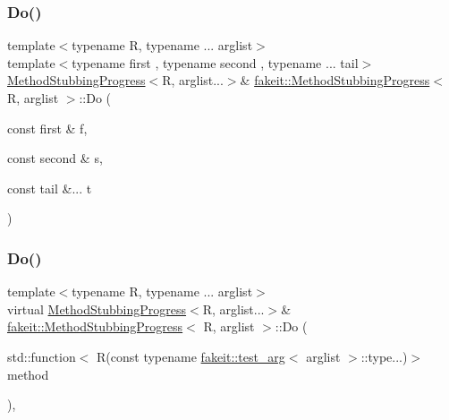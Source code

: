 \mbox{\label{structfakeit_1_1MethodStubbingProgress_a157561400e37da65c5b48f4466fc603c}} 
\subsubsection{\texorpdfstring{Do()}{Do()}\hspace{0.1cm}{\footnotesize\ttfamily [21/27]}}
{\footnotesize\ttfamily template$<$typename R, typename ... arglist$>$ \\
template$<$typename first , typename second , typename ... tail$>$ \\
\mbox{\hyperlink{structfakeit_1_1MethodStubbingProgress}{Method\+Stubbing\+Progress}}$<$R, arglist...$>$\& \mbox{\hyperlink{structfakeit_1_1MethodStubbingProgress}{fakeit\+::\+Method\+Stubbing\+Progress}}$<$ R, arglist $>$\+::Do (\begin{DoxyParamCaption}\item[{const first \&}]{f,  }\item[{const second \&}]{s,  }\item[{const tail \&...}]{t }\end{DoxyParamCaption})\hspace{0.3cm}{\ttfamily [inline]}}

\mbox{\label{structfakeit_1_1MethodStubbingProgress_a9ef4c2db8e567aa312b708613d240ae1}} 
\subsubsection{\texorpdfstring{Do()}{Do()}\hspace{0.1cm}{\footnotesize\ttfamily [22/27]}}
{\footnotesize\ttfamily template$<$typename R, typename ... arglist$>$ \\
virtual \mbox{\hyperlink{structfakeit_1_1MethodStubbingProgress}{Method\+Stubbing\+Progress}}$<$R, arglist...$>$\& \mbox{\hyperlink{structfakeit_1_1MethodStubbingProgress}{fakeit\+::\+Method\+Stubbing\+Progress}}$<$ R, arglist $>$\+::Do (\begin{DoxyParamCaption}\item[{std\+::function$<$ R(const typename \mbox{\hyperlink{structfakeit_1_1test__arg}{fakeit\+::test\+\_\+arg}}$<$ arglist $>$\+::type...)$>$}]{method }\end{DoxyParamCaption})\hspace{0.3cm}{\ttfamily [inline]}, {\ttfamily [virtual]}}

